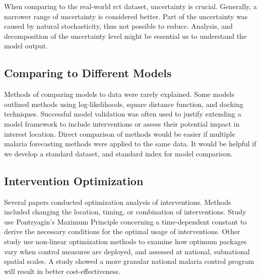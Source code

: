\documentclass[a4paper, 12pt, twoside]{report}
\begin{document}
When comparing to the real-world \gls{rct} dataset, uncertainty is crucial.
Generally, a narrower range of uncertainty is considered better.
Part of the uncertainty was caused by natural stochasticity, thus not possible to reduce.
Analysis, and decomposition of the uncertainty level might be essential us to understand the model output.

%

\subsection{Comparing to Different Models}%
\label{par:comparing_models}
Methods of comparing models to data were rarely explained.
Some models outlined methods using log-likelihoods, square distance function, and docking techniques.
Successful model validation was often used to justify extending a model framework to include interventions or assess their potential impact in interest location.
Direct comparison of methods would be easier if multiple malaria forecasting methods were applied to the same data.
It would be helpful if we develop a standard dataset, and standard index for model comparison.


\subsection{Intervention Optimization}
Several papers\cite{Tchoumi2020,Smith2008,Cameron2015,Winskill2019} conducted optimization analysis of interventions.
Methods included changing the location, timing, or combination of interventions.
Study use Pontryagin’s Maximum Principle\cite{Tchoumi2020} concerning a time-dependent constant to derive the necessary conditions for the optimal usage of interventions.
Other study use non-linear optimization methods\cite{Walker2016} to examine how optimum packages vary when control measures are deployed, and assessed at national, subnational spatial scales.
A study showed a more granular national malaria control program will result in better cost-effectiveness\cite{Walker2016}.
\end{document}
